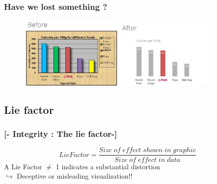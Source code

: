 \documentclass[xcolor=x11names,compress, aspectratio=169]{beamer}
\renewcommand{\(}{\begin{columns}}
\renewcommand{\)}{\end{columns}}
\newcommand{\<}[1]{\begin{column}{#1}}
\renewcommand{\>}{\end{column}}
\begin{document}
\begin{frame} %
\frametitle{\textcolor{siap}{Have we lost something ?} }
\begin{figure}[h]
\includegraphics[width = 0.45\textwidth]{M2-Data-Ink-Ratio-Barsbefore.JPG}
\includegraphics[width = 0.45\textwidth]{M2-Data-Ink-Ratio-BarsAfter.JPG}
\end{figure}
\end{frame}


\subsection{Lie factor}
\begin{frame} %
\frametitle{\textcolor{brique}{[- Integrity : The lie factor-]}}
\begin{equation}
Lie Factor = \frac{Size\;  of\; effect\;shown \; in \; graphic}{Size \; of\; effect \; in \; data}
\end{equation}
A Lie Factor $\neq$ 1 indicates a substantial distortion\\
$\hookrightarrow $ Deceptive or misleading visualization!!
\end{frame}
\end{document}
